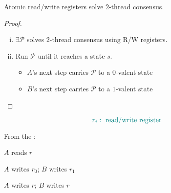 
\begin{frame}{}
  \begin{columns}
      \pause
  \end{columns}
\end{frame}

\begin{frame}{}
  \begin{theorem}
    Atomic read/write registers  solve $2$-thread consensus.
  \end{theorem}

  \pause
  \vspace{0.60cm}
  \begin{proof}
    \begin{enumerate}[(i)]
      \setlength{\itemsep}{5pt}
      \item {} $\exists \mathcal{P}$ solves $2$-thread consensus using R/W registers.
      \pause
      \item Run $\mathcal{P}$ until it reaches a  state $s$.
	\pause
	\begin{itemize}
	  \setlength{\itemsep}{3pt}
	  \item $A$'s next step carries $\mathcal{P}$ to a $0$-valent state
	  \item $B$'s next step carries $\mathcal{P}$ to a $1$-valent state
	\end{itemize}
    \end{enumerate}

    \pause
    \vspace{0.50cm}
    \centerline{\large {}}
  \end{proof}
\end{frame}

\begin{frame}{}
  \[
    \textcolor{teal}{r_i: \text{ read/write register}}
  \]

  From the :
  \begin{description}
    \setlength{\itemsep}{10pt}
    \item[\textsc{Case 1}:] $A$ reads $r$
    \item[\textsc{Case 2}:] $A$ writes $r_0$; \quad $B$ writes $r_1$
    \item[\textsc{Case 3}:] $A$ writes $r$; \quad $B$ writes $r$
  \end{description}
\end{frame}

